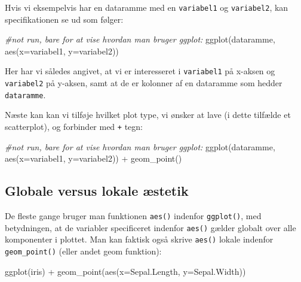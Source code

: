 \documentclass[
]{book}
\newenvironment{Shaded}{\begin{snugshade}}{\end{snugshade}}
\newcommand{\AttributeTok}[1]{\textcolor[rgb]{0.77,0.63,0.00}{#1}}
\newcommand{\CommentTok}[1]{\textcolor[rgb]{0.56,0.35,0.01}{\textit{#1}}}
\newcommand{\FunctionTok}[1]{\textcolor[rgb]{0.00,0.00,0.00}{#1}}
\newcommand{\NormalTok}[1]{#1}
\newcommand{\SpecialCharTok}[1]{\textcolor[rgb]{0.00,0.00,0.00}{#1}}
\begin{document}
Hvis vi eksempelvis har en dataramme med en \texttt{variabel1} og \texttt{variabel2}, kan specifikationen se ud som følger:

\begin{Shaded}
\begin{Highlighting}[]
\CommentTok{\#not run, bare for at vise hvordan man bruger ggplot:}
\FunctionTok{ggplot}\NormalTok{(dataramme, }\FunctionTok{aes}\NormalTok{(}\AttributeTok{x=}\NormalTok{variabel1, }\AttributeTok{y=}\NormalTok{variabel2)) }
\end{Highlighting}
\end{Shaded}

Her har vi således angivet, at vi er interesseret i \texttt{variabel1} på x-aksen og \texttt{variabel2} på y-aksen, samt at de er kolonner af en dataramme som hedder \texttt{dataramme}.

Næste kan kan vi tilføje hvilket plot type, vi ønsker at lave (i dette tilfælde et scatterplot), og forbinder med \texttt{+} tegn:

\begin{Shaded}
\begin{Highlighting}[]
\CommentTok{\#not run, bare for at vise hvordan man bruger ggplot:}
\FunctionTok{ggplot}\NormalTok{(dataramme, }\FunctionTok{aes}\NormalTok{(}\AttributeTok{x=}\NormalTok{variabel1, }\AttributeTok{y=}\NormalTok{variabel2)) }\SpecialCharTok{+}
  \FunctionTok{geom\_point}\NormalTok{()}
\end{Highlighting}
\end{Shaded}

\hypertarget{globale-versus-lokale-uxe6stetik}{%
\subsection{Globale versus lokale æstetik}\label{globale-versus-lokale-uxe6stetik}}

De fleste gange bruger man funktionen \texttt{aes()} indenfor \texttt{ggplot()}, med betydningen, at de variabler specificeret indenfor \texttt{aes()} gælder globalt over alle komponenter i plottet. Man kan faktisk også skrive \texttt{aes()} lokale indenfor \texttt{geom\_point()} (eller andet geom funktion):

\begin{Shaded}
\begin{Highlighting}[]
\FunctionTok{ggplot}\NormalTok{(iris) }\SpecialCharTok{+}
  \FunctionTok{geom\_point}\NormalTok{(}\FunctionTok{aes}\NormalTok{(}\AttributeTok{x=}\NormalTok{Sepal.Length, }\AttributeTok{y=}\NormalTok{Sepal.Width))}
\end{Highlighting}
\end{Shaded}
\end{document}
